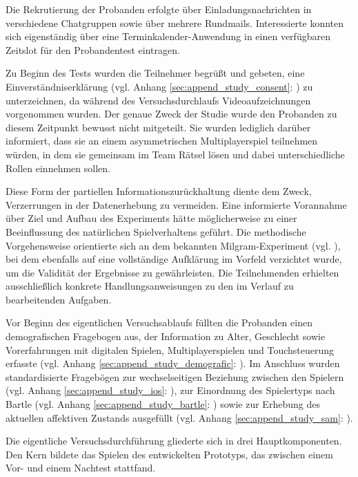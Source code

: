 Die Rekrutierung der Probanden erfolgte über Einladungsnachrichten in verschiedene Chatgruppen sowie über mehrere Rundmails. Interessierte konnten sich eigenständig über eine Terminkalender-Anwendung in einen verfügbaren Zeitslot für den Probandentest eintragen.

Zu Beginn des Tests wurden die Teilnehmer begrüßt und gebeten, eine Einverständniserklärung (vgl. Anhang \ref{sec:append_study_consent}: ) zu unterzeichnen, da während des Versuchsdurchlaufs Videoaufzeichnungen vorgenommen wurden. Der genaue Zweck der Studie wurde den Probanden zu diesem Zeitpunkt bewusst nicht mitgeteilt. Sie wurden lediglich darüber informiert, dass sie an einem asymmetrischen Multiplayerspiel teilnehmen würden, in dem sie gemeinsam im Team Rätsel lösen und dabei unterschiedliche Rollen einnehmen sollen.

Diese Form der partiellen Informationszurückhaltung diente dem Zweck, Verzerrungen in der Datenerhebung zu vermeiden. Eine informierte Vorannahme über Ziel und Aufbau des Experiments hätte möglicherweise zu einer Beeinflussung des natürlichen Spielverhaltens geführt. Die methodische Vorgehensweise orientierte sich an dem bekannten Milgram-Experiment (vgl. \citealp{milgram_behavioral_1963}), bei dem ebenfalls auf eine vollständige Aufklärung im Vorfeld verzichtet wurde, um die Validität der Ergebnisse zu gewährleisten. Die Teilnehmenden erhielten ausschließlich konkrete Handlungsanweisungen zu den im Verlauf zu bearbeitenden Aufgaben.

Vor Beginn des eigentlichen Versuchsablaufs füllten die Probanden einen demografischen Fragebogen aus, der Information zu Alter, Geschlecht sowie Vorerfahrungen mit digitalen Spielen, Multiplayerspielen und Touchsteuerung erfasste (vgl. Anhang \ref{sec:append_study_demografic}: ). Im Anschluss wurden standardisierte Fragebögen zur wechselseitigen Beziehung zwischen den Spielern (vgl. Anhang \ref{sec:append_study_ios}: ), zur Einordnung des Spielertyps nach Bartle (vgl. Anhang \ref{sec:append_study_bartle}: ) sowie zur Erhebung des aktuellen affektiven Zustands ausgefüllt (vgl. Anhang \ref{sec:append_study_sam}: ).

Die eigentliche Versuchsdurchführung gliederte sich in drei Hauptkomponenten. Den Kern bildete das Spielen des entwickelten Prototyps, das zwischen einem Vor- und einem Nachtest stattfand.

